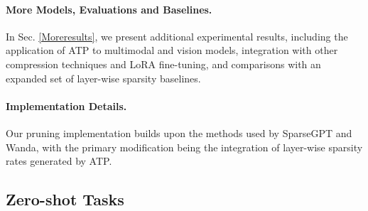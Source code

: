 \paragraph{More Models, Evaluations and Baselines.} In Sec. \ref{Moreresults}, we present additional experimental results, including the application of ATP to multimodal and vision models, integration with other compression techniques and LoRA fine-tuning, and comparisons with an expanded set of layer-wise sparsity baselines.  
\paragraph{Implementation Details.} Our pruning implementation builds upon the methods used by SparseGPT and Wanda, with the primary modification being the integration of layer-wise sparsity rates generated by ATP. 

\subsection{Zero-shot Tasks}
